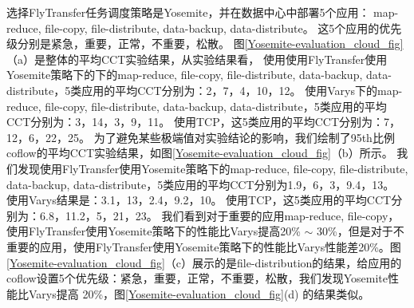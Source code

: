 选择FlyTransfer任务调度策略是Yosemite，并在数据中心中部署5个应用： map-reduce, file-copy, file-distribute, data-backup, data-distribute。
这5个应用的优先级分别是紧急，重要，正常，不重要，松散。
图\ref{Yosemite-evaluation_cloud_fig}（a）是整体的平均CCT实验结果，从实验结果看，
使用使用FlyTransfer使用Yosemite策略下的下的map-reduce, file-copy, file-distribute, data-backup, data-distribute，5类应用的平均CCT分别为：2，7，4，10，12。
使用Varys下的map-reduce, file-copy, file-distribute, data-backup, data-distribute，5类应用的平均CCT分别为：3，14，3，9，11。
使用TCP，这5类应用的平均CCT分别为：7，12，6，22，25。
为了避免某些极端值对实验结论的影响，我们绘制了95th比例coflow的平均CCT实验结果，如图\ref{Yosemite-evaluation_cloud_fig}（b）所示。
我们发现使用FlyTransfer使用Yosemite策略下的map-reduce, file-copy, file-distribute, data-backup, data-distribute，5类应用的平均CCT分别为1.9，6，3，9.4，13。
使用Varys结果是：3.1，13，2.4，9.2，10。
使用TCP，这5类应用的平均CCT分别为：6.8，11.2，5，21，23。
我们看到对于重要的应用map-reduce, file-copy，使用FlyTransfer使用Yosemite策略下的性能比Varys提高20\% $ \sim$ 30\%，但是对于不重要的应用，使用FlyTransfer使用Yosemite策略下的性能比Varys性能差20\%。图\ref{Yosemite-evaluation_cloud_fig}（c）展示的是file-distribution的结果，给应用的coflow设置5个优先级：紧急，重要，正常，不重要，松散，我们发现Yosemite性能比Varys提高 20\%，图\ref{Yosemite-evaluation_cloud_fig}(d) 的结果类似。

